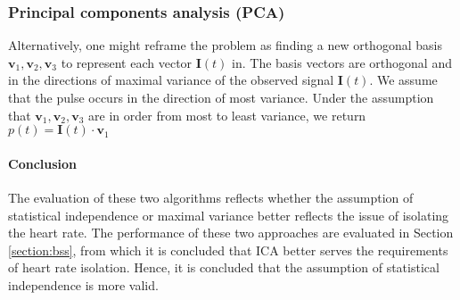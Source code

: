 \subsubsection{Principal components analysis (PCA)}
Alternatively, one might reframe the problem as finding a new orthogonal basis $\mathbf{v}_1, \mathbf{v}_2, \mathbf{v}_3$ to represent each vector $\mathbf{I}(t)$ in. The basis vectors are orthogonal and in the directions of maximal variance of the observed signal $\mathbf{I}(t)$.
We assume that the pulse occurs in the direction of most variance.
Under the assumption that $\mathbf{v}_1, \mathbf{v}_2, \mathbf{v}_3$ are in order from most to least variance, we return $p(t) = \mathbf{I}(t)\cdot\mathbf{v}_1$





\paragraph{Conclusion}
The evaluation of these two algorithms reflects whether the assumption of statistical independence or maximal variance better reflects the issue of isolating the heart rate. The performance of these two approaches are evaluated in Section \ref{section:bss}, from which it is concluded that ICA better serves the requirements of heart rate isolation. Hence, it is concluded that the assumption of statistical independence is more valid.

